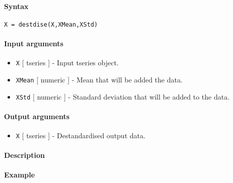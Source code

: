 


	\paragraph{Syntax}\label{syntax}

\begin{verbatim}
X = destdise(X,XMean,XStd)
\end{verbatim}

\paragraph{Input arguments}\label{input-arguments}

\begin{itemize}
\item
  \texttt{X} {[} tseries {]} - Input tseries object.
\item
  \texttt{XMean} {[} numeric {]} - Mean that will be added the data.
\item
  \texttt{XStd} {[} numeric {]} - Standard deviation that will be added
  to the data.
\end{itemize}

\paragraph{Output arguments}\label{output-arguments}

\begin{itemize}
\itemsep1pt\parskip0pt
\item
  \texttt{X} {[} tseries {]} - Destandardised output data.
\end{itemize}

\paragraph{Description}\label{description}

\paragraph{Example}\label{example}


